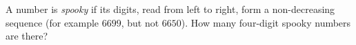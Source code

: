 A number is \emph{spooky} if its digits, read from left to right, form a non-decreasing sequence (for example $6699$, but not $6650$). How many four-digit spooky numbers are there?
